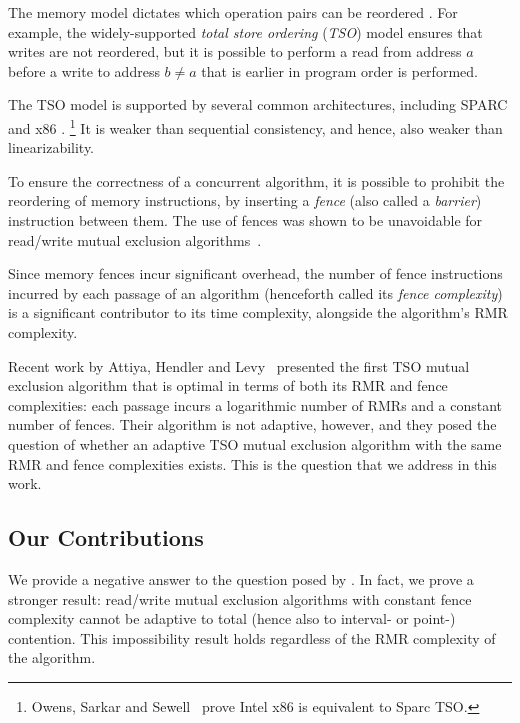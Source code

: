 The memory model dictates which operation pairs can be reordered \cite[Figure 8]{DBLP:journals/computer/AdveG96}.
For example, the widely-supported \emph{total store ordering} (\emph{TSO}) model \cite{SPARCManual} ensures that writes are not reordered, but it is possible to perform a read from address $a$
before a write to address $b \neq a$ that is earlier in program order is performed.

The TSO model is supported by several common architectures,
including SPARC \cite{SPARCManual} and x86 \cite{intelsys}. \footnote{Owens, Sarkar and Sewell~\cite{OwensSS2009} prove Intel x86 is equivalent to Sparc TSO.}
It is weaker than sequential consistency, and hence,
also weaker than linearizability.

To ensure the correctness of a concurrent algorithm,
it is possible to prohibit the reordering of memory instructions,
by inserting a \emph{fence} (also called a \emph{barrier})
instruction between them.
The use of fences was shown to be unavoidable for read/write mutual exclusion algorithms~\cite{DBLP:conf/popl/AttiyaGHKMV11}.

Since memory fences incur significant overhead, the number of fence instructions incurred by each passage of an algorithm (henceforth called its \emph{fence complexity}) is a significant contributor to its time complexity, alongside the algorithm's RMR complexity.

Recent work by Attiya, Hendler and Levy~\cite{DBLP:conf/podc/AttiyaHL13} presented the first TSO mutual exclusion algorithm that is optimal in terms of both its RMR and fence complexities: each passage incurs a logarithmic number of RMRs and a constant number of fences. Their algorithm is not adaptive, however, and they posed the question of whether an adaptive TSO mutual exclusion algorithm with the same RMR and fence complexities exists. This is the question that we address in this work.

\subsection*{Our Contributions}

We provide a negative answer to the question posed by \cite{DBLP:conf/podc/AttiyaHL13}. In fact, we prove a stronger result: read/write mutual exclusion algorithms with constant fence complexity cannot be adaptive to total (hence also to interval- or point-) contention. This impossibility result holds regardless of the RMR complexity of the algorithm.

